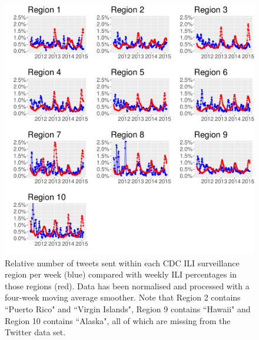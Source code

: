 \documentclass[11pt, a4paper,twoside]{report}\usepackage[]{graphicx}\usepackage[]{color}
\begin{document}
\begin{figure}[H]
\centering
\includegraphics[width=1\linewidth]{cdc_twitter_comp_regs_ma4.pdf}
\caption{Relative number of tweets sent within each CDC ILI surveillance region per week (blue) compared with weekly ILI percentages in those regions (red). Data has been normalised and processed with a four-week moving average smoother. Note that Region 2 contains ``Puerto Rico" and ``Virgin Islands", Region 9 contains ``Hawaii" and Region 10 contains ``Alaska", all of which are missing from the Twitter data set.}
\label{fig:cdc_tw_comp_regs_ma4}
\end{figure}
\end{document}
